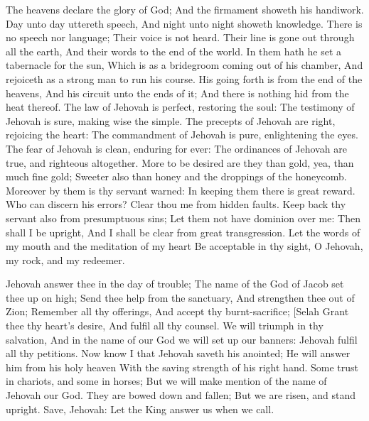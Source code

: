 The heavens declare the glory of God; And the firmament showeth his handiwork.  Day unto day uttereth speech, And night unto night showeth knowledge.  There is no speech nor language; Their voice is not heard.  Their line is gone out through all the earth, And their words to the end of the world. In them hath he set a tabernacle for the sun,  Which is as a bridegroom coming out of his chamber, And rejoiceth as a strong man to run his course.  His going forth is from the end of the heavens, And his circuit unto the ends of it; And there is nothing hid from the heat thereof.  The law of Jehovah is perfect, restoring the soul: The testimony of Jehovah is sure, making wise the simple.  The precepts of Jehovah are right, rejoicing the heart: The commandment of Jehovah is pure, enlightening the eyes.  The fear of Jehovah is clean, enduring for ever: The ordinances of Jehovah are true, and righteous altogether.  More to be desired are they than gold, yea, than much fine gold; Sweeter also than honey and the droppings of the honeycomb.  Moreover by them is thy servant warned: In keeping them there is great reward.  Who can discern his errors? Clear thou me from hidden faults.  Keep back thy servant also from presumptuous sins; Let them not have dominion over me: Then shall I be upright, And I shall be clear from great transgression.  Let the words of my mouth and the meditation of my heart Be acceptable in thy sight, O Jehovah, my rock, and my redeemer. 

Jehovah answer thee in the day of trouble; The name of the God of Jacob set thee up on high;  Send thee help from the sanctuary, And strengthen thee out of Zion;  Remember all thy offerings, And accept thy burnt-sacrifice; [Selah  Grant thee thy heart’s desire, And fulfil all thy counsel.  We will triumph in thy salvation, And in the name of our God we will set up our banners: Jehovah fulfil all thy petitions.  Now know I that Jehovah saveth his anointed; He will answer him from his holy heaven With the saving strength of his right hand.  Some trust in chariots, and some in horses; But we will make mention of the name of Jehovah our God.  They are bowed down and fallen; But we are risen, and stand upright.  Save, Jehovah: Let the King answer us when we call. 

